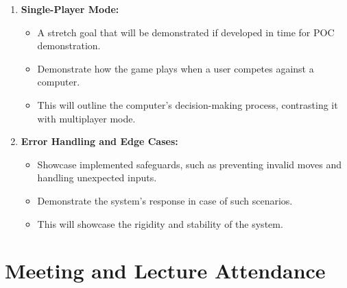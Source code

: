 \documentclass{article}
\begin{document}
\begin{enumerate}
    \item \textbf{Single-Player Mode:}
    \begin{itemize}
        \item A stretch goal that will be demonstrated if developed in time for POC demonstration.
        \item Demonstrate how the game plays when a user competes against a computer.
        \item This will outline the computer's decision-making process, contrasting it with multiplayer mode.
    \end{itemize}
    
    \item \textbf{Error Handling and Edge Cases:}
    \begin{itemize}
        \item Showcase implemented safeguards, such as preventing invalid moves and handling unexpected inputs.
        \item Demonstrate the system's response in case of such scenarios.
        \item This will showcase the rigidity and stability of the system.
    \end{itemize}
\end{enumerate}



\newpage
\section{Meeting and Lecture Attendance}



\end{document}

